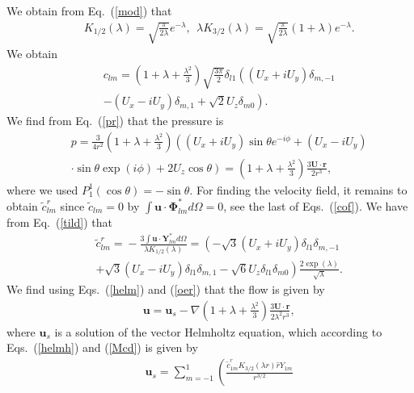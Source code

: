 \documentclass[aps,prx,twocolumn,amsmath,amssymb,amsfonts]{revtex4-2}
\begin{document}
{{\begin{appendices}
We obtain from Eq.~(\ref{mod}) that
\begin{eqnarray}&&\!\!\!\!\!\!\!\!
K_{1/2}(\lambda)\!=\!\sqrt{\frac{\pi}{2\lambda}}e^{-\lambda},\ \ \lambda K_{3/2}(\lambda)\!=\!\sqrt{\frac{\pi}{2\lambda}}(1\!+\!\lambda)e^{-\lambda}. \label{Mcd}
\end{eqnarray}
We obtain
\begin{eqnarray}&&
c_{lm}\!=\!\left(1+\lambda+\frac{\lambda^2}{3}\right)\sqrt{\frac{3\pi}{2}}\delta_{l1} \left(\left(U_x+iU_y\right)\delta_{m, -1}
\right.\nonumber\\&&\left.
-(U_x-i U_y) \delta_{m, 1}+ \sqrt{2}U_z\delta_{m0}\right).
\end{eqnarray}
We find from Eq.~(\ref{pr}) that the pressure is
\begin{eqnarray}&&
p\!= \!\frac{3}{4r^2} \left(1\!+\!\lambda\!+\!\frac{\lambda^2}{3}\right) \left(\left(U_x\!+\!iU_y\right)\sin\theta e^{-i\phi}+\!(U_x\!-\!i U_y)
\right.\nonumber\\&&\left.
\cdot \sin\theta\exp\left(i\phi\right)\!+\!2U_z \cos\theta\right)\!=\!\left(1\!+\!\lambda\!+\!\frac{\lambda^2}{3}\right)\frac{3\bm U\!\cdot \!\bm r}{2r^3},\label{oer}
\end{eqnarray}
where we used $P_1^1(\cos\theta)=-\sin\theta$. For finding the velocity field, it remains to obtain ${\tilde c}^{r}_{lm}$ since ${\tilde c}_{lm}=0$ by $\int \!\!\bm u\!\cdot\! \bm \Phi_{lm}^* d\Omega\!=\!0$, see the last of Eqs.~(\ref{cof}). We have from Eq.~(\ref{tild}) that
\begin{eqnarray}&&
{\tilde c}^{r}_{lm} \!=\!-\frac{3\int \bm u\cdot \bm Y_{lm}^* d\Omega}{\lambda K_{1/2}(\lambda)}=
\left(-\sqrt{3} \left(U_x+iU_y\right)\delta_{l1}\delta_{m, -1}
\right.\nonumber\\&&\left.
+\sqrt{3}(U_x-i U_y) \delta_{l1}\delta_{m, 1}- \sqrt{6}U_z\delta_{l1}\delta_{m0}\right)\frac{2\exp(\lambda)}{ \sqrt{\lambda}}.
\end{eqnarray}
We find using Eqs.~(\ref{helm}) and (\ref{oer}) that the flow is given by
\begin{eqnarray}&&\!\!\!\!\!\!\!\!\!\!\!\!\!\!\!\!
\bm u=\bm u_s-\nabla \left(1\!+\!\lambda\!+\!\frac{\lambda^2}{3}\right)\frac{3\bm U\!\cdot \!\bm r}{2\lambda^2 r^3},\label{cs}
\end{eqnarray}
where $\bm u_s$ is a solution of the vector Helmholtz equation, which according to Eqs.~(\ref{helmh}) and (\ref{Mcd}) is given by
\begin{eqnarray}&&
\bm u_s\!=\!\sum_{m=-1}^1 \left(\frac{{\tilde c}^{r}_{1m} K_{3/2}(\lambda r){\hat r} Y_{1m}}{r^{3/2}}

\end{eqnarray}
\end{appendices}}}
\end{document}
